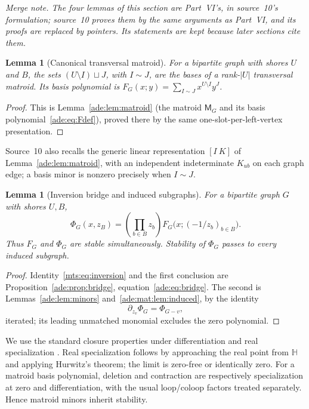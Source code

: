 \documentclass[11pt]{article}
\numberwithin{equation}{section}
\newtheorem{lemma}[theorem]{Lemma}
\theoremstyle{definition}
\newcommand{\HH}{\mathbb H}
\begin{document}
\noindent\emph{Merge note. The four lemmas of this section are Part~VI's,
in source~10's formulation; source~10 proves them by the same arguments as
Part~VI, and its proofs are replaced by pointers. Its statements are kept
because later sections cite them.}

\begin{lemma}[Canonical transversal matroid]\label{mts:lem:matroid}
For a bipartite graph with shores $U$ and $B$, the sets
$(U\setminus I)\sqcup J$, with $I\sim J$, are the bases of a rank-$|U|$
transversal matroid. Its basis polynomial is
$F_G(x;y)=\sum_{I\sim J}x^{U\setminus I}y^J$.
\end{lemma}
\begin{proof}
This is Lemma~\ref{ade:lem:matroid} (the matroid $\mathsf M_G$ and its basis
polynomial~\eqref{ade:eq:Fdef}), proved there by the same one-slot-per-left-vertex
presentation.
\end{proof}

Source~10 also recalls the generic linear representation $[I\ K]$ of
Lemma~\ref{ade:lem:matroid}, with an independent indeterminate $K_{ub}$ on
each graph edge; a basis minor is nonzero precisely when $I\sim J$.

\begin{lemma}[Inversion bridge and induced subgraphs]\label{mts:lem:bridge}
For a bipartite graph $G$ with shores $U,B$,
\begin{equation}
 \Phi_G(x,z_B)=\left(\prod_{b\in B}z_b\right)
                F_G\bigl(x;(-1/z_b)_{b\in B}\bigr).
 \label{mts:eq:inversion}
\end{equation}
Thus $F_G$ and $\Phi_G$ are stable simultaneously. Stability of $\Phi_G$
passes to every induced subgraph.
\end{lemma}
\begin{proof}
Identity~\eqref{mts:eq:inversion} and the first conclusion are
Proposition~\ref{ade:prop:bridge}, equation~\eqref{ade:eq:bridge}. The
second is Lemmas~\ref{ade:lem:minors} and~\ref{ade:mat:lem:induced}, by the
identity
\begin{equation}
 \partial_{z_v}\Phi_G=\Phi_{G-v},
 \label{mts:eq:induced}
\end{equation}
iterated; its leading unmatched monomial excludes the zero polynomial.
\end{proof}

We use the standard closure properties under differentiation and real
specialization \cite{COSW,Branden}. Real specialization follows by
approaching the real point from $\HH$ and applying Hurwitz's theorem; the
limit is zero-free or identically zero. For a matroid basis polynomial,
deletion and contraction are respectively specialization at zero and
differentiation, with the usual loop/coloop factors treated separately.
Hence matroid minors inherit stability.
\end{document}
